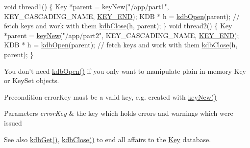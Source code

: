 \begin{DoxyCodeInclude}
\textcolor{keywordtype}{void} thread1()
\{
        Key *parent = \hyperlink{group__key_gad23c65b44bf48d773759e1f9a4d43b89}{keyNew}(\textcolor{stringliteral}{"/app/part1"}, KEY\_CASCADING\_NAME, \hyperlink{group__key_gga91fb3178848bd682000958089abbaf40aa8adb6fcb92dec58fb19410eacfdd403}{KEY\_END});
        KDB * h = \hyperlink{group__kdb_ga6808defe5870f328dd17910aacbdc6ca}{kdbOpen}(parent);
        \textcolor{comment}{// fetch keys and work with them}
        \hyperlink{group__kdb_gadb54dc9fda17ee07deb9444df745c96f}{kdbClose}(h, parent);
\}
\textcolor{keywordtype}{void} thread2()
\{
        Key *parent = \hyperlink{group__key_gad23c65b44bf48d773759e1f9a4d43b89}{keyNew}(\textcolor{stringliteral}{"/app/part2"}, KEY\_CASCADING\_NAME, \hyperlink{group__key_gga91fb3178848bd682000958089abbaf40aa8adb6fcb92dec58fb19410eacfdd403}{KEY\_END});
        KDB * h = \hyperlink{group__kdb_ga6808defe5870f328dd17910aacbdc6ca}{kdbOpen}(parent);
        \textcolor{comment}{// fetch keys and work with them}
        \hyperlink{group__kdb_gadb54dc9fda17ee07deb9444df745c96f}{kdbClose}(h, parent);
\}
\end{DoxyCodeInclude}
 You don't need \hyperlink{group__kdb_ga6808defe5870f328dd17910aacbdc6ca}{kdb\+Open()} if you only want to manipulate plain in-\/memory Key or Key\+Set objects.

\begin{DoxyPrecond}{Precondition}
error\+Key must be a valid key, e.\+g. created with \hyperlink{group__key_gad23c65b44bf48d773759e1f9a4d43b89}{key\+New()}
\end{DoxyPrecond}

\begin{DoxyParams}{Parameters}
{\em error\+Key} & the key which holds errors and warnings which were issued \\
\hline
\end{DoxyParams}
\begin{DoxySeeAlso}{See also}
\hyperlink{group__kdb_ga28e385fd9cb7ccfe0b2f1ed2f62453a1}{kdb\+Get()}, \hyperlink{group__kdb_gadb54dc9fda17ee07deb9444df745c96f}{kdb\+Close()} to end all affairs to the \hyperlink{group__key}{Key} database. 
\end{DoxySeeAlso}


